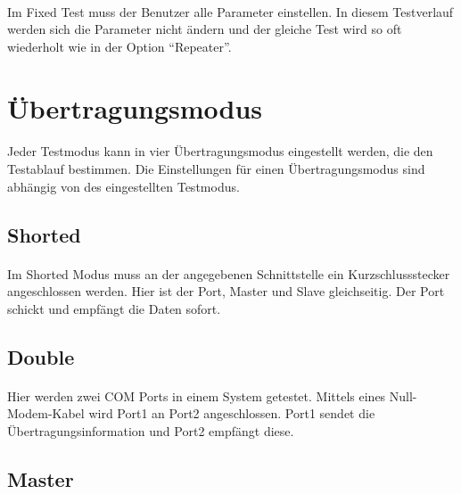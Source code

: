 \paragraph{}
Im Fixed Test muss der Benutzer alle Parameter einstellen. In diesem Testverlauf werden sich die Parameter nicht ändern und der gleiche Test wird so oft wiederholt wie in der Option "`Repeater"'.



\section{Übertragungsmodus}
\paragraph{}
Jeder Testmodus kann in vier Übertragungsmodus eingestellt werden, die den Testablauf bestimmen. Die Einstellungen für einen Übertragungsmodus sind abhängig von des eingestellten Testmodus.


\subsection{Shorted}
\paragraph{}
Im Shorted Modus muss an der angegebenen Schnittstelle ein Kurzschlussstecker angeschlossen werden. Hier ist der Port, Master und Slave gleichseitig. Der Port schickt und empfängt die Daten sofort.


\subsection{Double}
\paragraph{}
Hier werden zwei COM Ports in einem System getestet. Mittels eines Null-Modem-Kabel wird Port1 an Port2 angeschlossen. Port1 sendet die Übertragungsinformation und Port2 empfängt diese.


\subsection{Master}

